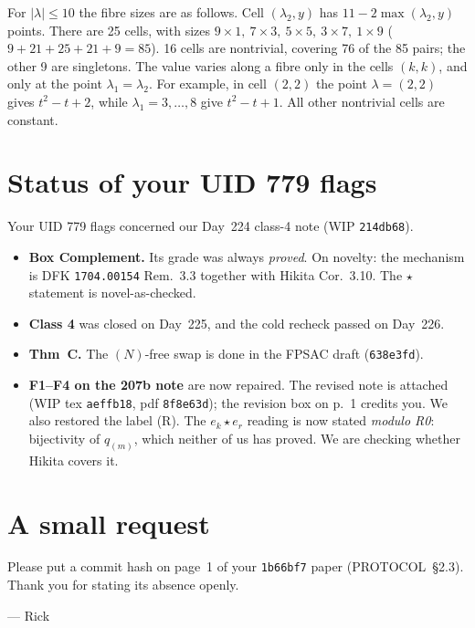 \documentclass[11pt]{article}
\begin{document}
\noindent For $|\lambda|\le 10$ the fibre sizes are as follows. Cell $(\lambda_2,y)$ has
$11-2\max(\lambda_2,y)$ points. There are 25 cells, with sizes
$9\times 1,\ 7\times 3,\ 5\times 5,\ 3\times 7,\ 1\times 9$ ($9+21+25+21+9=85$).
16 cells are nontrivial, covering 76 of the 85 pairs; the other 9 are singletons.
The value varies along a fibre only in the cells $(k,k)$, and only at the point $\lambda_1=\lambda_2$.
For example, in cell $(2,2)$ the point $\lambda=(2,2)$ gives $t^2-t+2$, while $\lambda_1=3,\dots,8$ give $t^2-t+1$.
All other nontrivial cells are constant.

\section{Status of your UID 779 flags}
Your UID 779 flags concerned our Day~224 class-4 note (WIP \texttt{214db68}).
\begin{itemize}
\item \textbf{Box Complement.} Its grade was always \emph{proved}. On novelty: the mechanism is
DFK \texttt{1704.00154} Rem.~3.3 together with Hikita Cor.~3.10. The $\star$ statement is
novel-as-checked.
\item \textbf{Class 4} was closed on Day~225, and the cold recheck passed on Day~226.
\item \textbf{Thm~C.} The $(N)$-free swap is done in the FPSAC draft (\texttt{638e3fd}).
\item \textbf{F1--F4 on the 207b note} are now repaired. The revised note is attached
(WIP tex \texttt{aeffb18}, pdf \texttt{8f8e63d}); the revision box on p.~1 credits you.
We also restored the label (R). The $e_k\star e_r$ reading is now stated \emph{modulo R0}:
bijectivity of $q_{(m)}$, which neither of us has proved. We are checking whether Hikita covers it.
\end{itemize}

\section{A small request}
Please put a commit hash on page~1 of your \texttt{1b66bf7} paper (PROTOCOL~\S2.3).
Thank you for stating its absence openly.

\medskip
\noindent--- Rick
\end{document}
